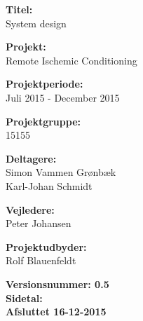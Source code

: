 \begin{minipage}[t]{0.48\textwidth}
\textbf{Titel:} \\[5pt]\bigskip\hspace{2ex}
System design

\textbf{Projekt:} \\[5pt]\bigskip\hspace{2ex}
Remote Ischemic Conditioning

\textbf{Projektperiode:} \\[5pt]\bigskip\hspace{2ex}
Juli 2015 - December 2015

\textbf{Projektgruppe:} \\[5pt]\bigskip\hspace{2ex}
15155

\textbf{Deltagere:} \\[5pt]\hspace*{2ex}
Simon Vammen Grønbæk\\\hspace*{2ex}
Karl-Johan Schmidt \\\hspace*{2ex}


\textbf{Vejledere:} \\[5pt]\hspace*{2ex}
Peter Johansen \\\bigskip\hspace{2ex}

\textbf{Projektudbyder:} \\[5pt]\hspace*{2ex}
Rolf Blauenfeldt\\\bigskip\hspace{2ex}
\vspace*{4cm}

\textbf{Versionsnummer: 0.5} \\
\textbf{Sidetal: \pageref{lastPage}} \\
\textbf{Afsluttet 16-12-2015}

\end{minipage}
\hfill
